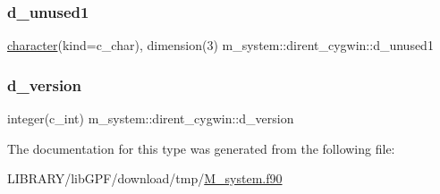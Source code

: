 \mbox{\label{structm__system_1_1dirent__cygwin_ae193da2503dd1c4368b288bfb2677369}} 
\subsubsection{\texorpdfstring{d\+\_\+unused1}{d\_unused1}}
{\footnotesize\ttfamily \hyperlink{option__stopwatch_83_8txt_abd4b21fbbd175834027b5224bfe97e66}{character}(kind=c\+\_\+char), dimension(3) m\+\_\+system\+::dirent\+\_\+cygwin\+::d\+\_\+unused1\hspace{0.3cm}{\ttfamily [private]}}

\mbox{\label{structm__system_1_1dirent__cygwin_a406355db287a68f3939379a9e2337484}} 
\subsubsection{\texorpdfstring{d\+\_\+version}{d\_version}}
{\footnotesize\ttfamily integer(c\+\_\+int) m\+\_\+system\+::dirent\+\_\+cygwin\+::d\+\_\+version\hspace{0.3cm}{\ttfamily [private]}}



The documentation for this type was generated from the following file\+:\begin{DoxyCompactItemize}
\item 
L\+I\+B\+R\+A\+R\+Y/lib\+G\+P\+F/download/tmp/\hyperlink{M__system_8f90}{M\+\_\+system.\+f90}\end{DoxyCompactItemize}
